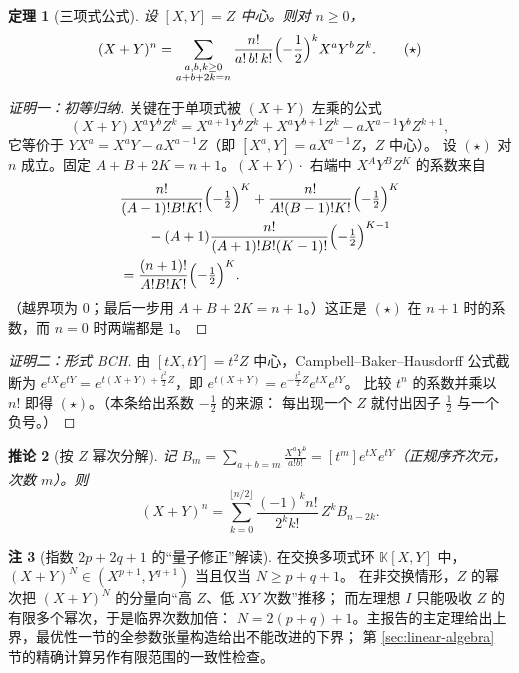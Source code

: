 \documentclass[11pt,UTF8]{ctexart}
\newtheorem{theorem}{定理}[section]
\newtheorem{corollary}[theorem]{推论}
\theoremstyle{definition}
\newtheorem{remark}[theorem]{注}
\newcommand{\K}{\mathbb{K}}
\begin{document}
\begin{theorem}[三项式公式]\label{thm:tri}
设 $[X,Y]=Z$ 中心。则对 $n\ge0$，
\[
(X+Y)^{n}=\sum_{\substack{a,b,k\ge0\\ a+b+2k=n}}\frac{n!}{a!\,b!\,k!}\Bigl(-\frac12\Bigr)^{k}X^{a}Y^{b}Z^{k}.
\tag{$\star$}
\]
\end{theorem}

\begin{proof}[证明一：初等归纳]
关键在于单项式被 $(X+Y)$ 左乘的公式
\[
(X+Y)X^{a}Y^{b}Z^{k}=X^{a+1}Y^{b}Z^{k}+X^{a}Y^{b+1}Z^{k}-aX^{a-1}Y^{b}Z^{k+1},
\]
它等价于 $YX^{a}=X^{a}Y-aX^{a-1}Z$（即 $[X^a,Y]=aX^{a-1}Z$，$Z$ 中心）。
设 $(\star)$ 对 $n$ 成立。固定 $A+B+2K=n+1$。$(X+Y)\cdot$ 右端中 $X^{A}Y^{B}Z^{K}$ 的系数来自
\[
\begin{aligned}
&\frac{n!}{(A-1)!B!K!}\Bigl(-\tfrac12\Bigr)^{K}
+\frac{n!}{A!(B-1)!K!}\Bigl(-\tfrac12\Bigr)^{K}\\
&\qquad -(A+1)\frac{n!}{(A+1)!B!(K-1)!}\Bigl(-\tfrac12\Bigr)^{K-1}\\
&=\frac{(n+1)!}{A!B!K!}\Bigl(-\tfrac12\Bigr)^{K}.
\end{aligned}
\]
（越界项为 $0$；最后一步用 $A+B+2K=n+1$。）这正是 $(\star)$ 在 $n+1$ 时的系数，而 $n=0$ 时两端都是 $1$。
\end{proof}

\begin{proof}[证明二：形式 BCH]
由 $[tX,tY]=t^2Z$ 中心，Campbell--Baker--Hausdorff 公式截断为
$e^{tX}e^{tY}=e^{t(X+Y)+\frac{t^{2}}{2}Z}$，即 $e^{t(X+Y)}=e^{-\frac{t^{2}}{2}Z}e^{tX}e^{tY}$。
比较 $t^{n}$ 的系数并乘以 $n!$ 即得 $(\star)$。（本条给出系数 $-\frac12$ 的来源：
每出现一个 $Z$ 就付出因子 $\frac12$ 与一个负号。）
\end{proof}

\begin{corollary}[按 $Z$ 幂次分解]\label{cor:zdecomp}
记 $B_m=\sum_{a+b=m}\frac{X^{a}Y^{b}}{a!b!}=[t^{m}]e^{tX}e^{tY}$（正规序齐次元，次数 $m$）。则
\[
(X+Y)^{n}=\sum_{k=0}^{\lfloor n/2\rfloor}\frac{(-1)^{k}n!}{2^{k}k!}\,Z^{k}B_{n-2k}.
\]
\end{corollary}

\begin{remark}[指数 $2p+2q+1$ 的“量子修正”解读]
在交换多项式环 $\K[X,Y]$ 中，$(X+Y)^{N}\in(X^{p+1},Y^{q+1})$ 当且仅当 $N\ge p+q+1$。
在非交换情形，$Z$ 的幂次把 $(X+Y)^N$ 的分量向“高 $Z$、低 $XY$ 次数”推移；
而左理想 $I$ 只能吸收 $Z$ 的有限多个幂次，于是临界次数加倍：
$N=2(p+q)+1$。主报告的主定理给出上界，最优性一节的全参数张量构造给出不能改进的下界；
第 \ref{sec:linear-algebra} 节的精确计算另作有限范围的一致性检查。
\end{remark}
\end{document}
